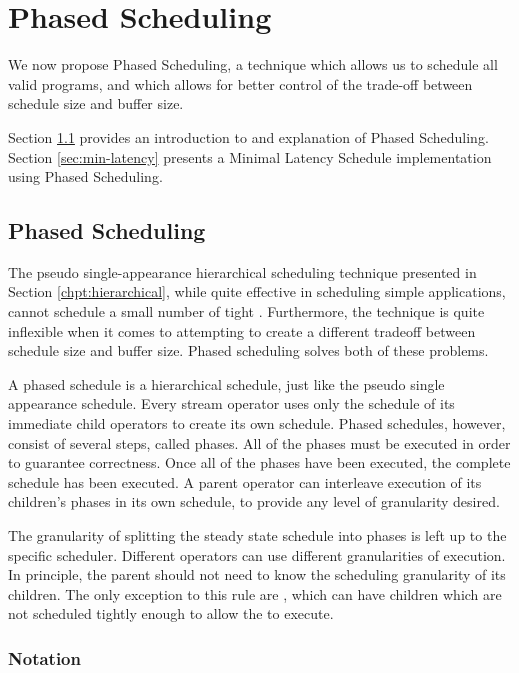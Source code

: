 \section{Phased Scheduling}
\label{chpt:phased}

We now propose Phased Scheduling, a technique which allows us to
schedule all valid {\StreamIt} programs, and which allows for
better control of the trade-off between schedule size and buffer
size.

Section \ref{sec:phased:intro} provides an introduction to and
explanation of Phased Scheduling. Section \ref{sec:min-latency}
presents a Minimal Latency Schedule implementation using Phased
Scheduling.

\subsection{Phased Scheduling}
\label{sec:phased:intro}

The pseudo single-appearance hierarchical scheduling technique
presented in Section \ref{chpt:hierarchical}, while quite
effective in scheduling simple applications, cannot schedule a
small number of tight {\feedbackloops}. Furthermore, the
technique is quite inflexible when it comes to attempting to
create a different tradeoff between schedule size and buffer size.
Phased scheduling solves both of these problems.

A phased schedule is a hierarchical schedule, just like the pseudo
single appearance schedule. Every stream operator uses only the
schedule of its immediate child operators to create its own
schedule. Phased schedules, however, consist of several steps,
called phases. All of the phases must be executed in order to
guarantee correctness. Once all of the phases have been executed,
the complete schedule has been executed. A parent operator can
interleave execution of its children's phases in its own schedule,
to provide any level of granularity desired.

The granularity of splitting the steady state schedule into phases
is left up to the specific scheduler.  Different operators can use
different granularities of execution.  In principle, the parent
should not need to know the scheduling granularity of its
children. The only exception to this rule are {\feedbackloops},
which can have children which are not scheduled tightly enough to
allow the {\feedbackloop} to execute.

\subsubsection{Notation}

